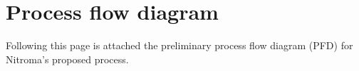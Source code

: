 \section{Process flow diagram}
\label{app:PFD}

Following this page is attached the preliminary process flow diagram (PFD) for Nitroma's proposed process.


